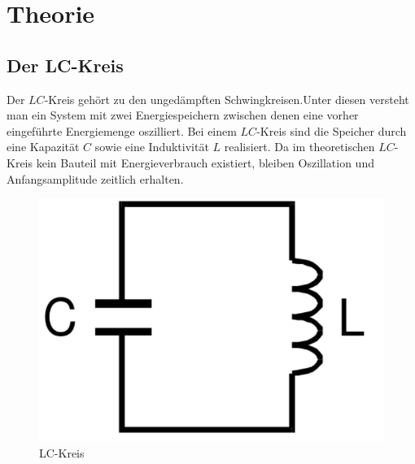 \section{Theorie}
\label{sec:Theorie}


\subsection{Der LC-Kreis}
Der $LC$-Kreis gehört zu den ungedämpften Schwingkreisen.Unter diesen versteht man
 ein System mit zwei Energiespeichern zwischen denen eine vorher eingeführte Energiemenge
  oszilliert. Bei einem $LC$-Kreis sind die Speicher durch eine Kapazität $C$ sowie
  eine Induktivität $L$ realisiert. Da im theoretischen $LC$-Kreis kein Bauteil mit Energieverbrauch
   existiert, bleiben Oszillation und Anfangsamplitude zeitlich erhalten.

   \begin{figure}[H]
     \centering
     \includegraphics[width=\linewidth-300pt,height=\textheight-300pt,keepaspectratio]{content/CL.png}
     \caption{LC-Kreis}
     \label{fig:CL_Kreis}
   \end{figure}

